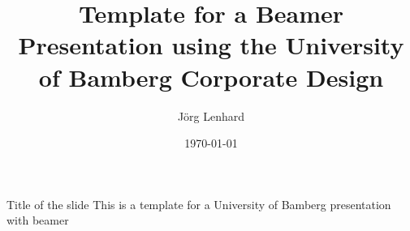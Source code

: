 \documentclass{beamer}
\title{Template for a Beamer Presentation using the University of Bamberg Corporate Design}
\author{J\"org Lenhard}
\institute{Distributed Systems Group - WIAI - University of Bamberg}
\date{\today}
\begin{document}
 \begin{frame}[plain]
	\titlepage
\end{frame}

\begin{frame}{Title of the slide}
This is a template for a University of Bamberg presentation with beamer
\end{frame}
\end{document}
